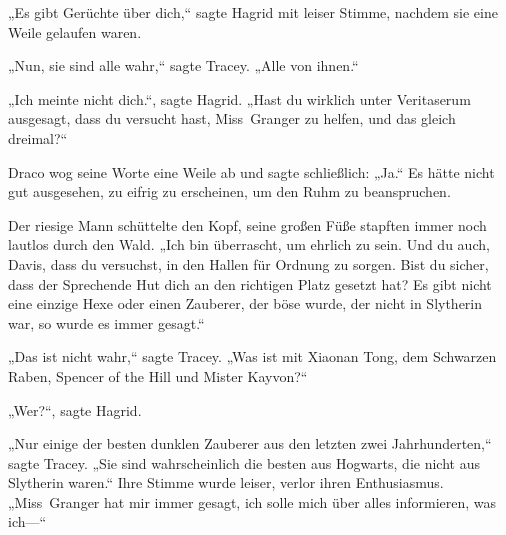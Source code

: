 „Es gibt Gerüchte über dich,“ sagte Hagrid mit leiser Stimme, nachdem sie eine Weile gelaufen waren.

„Nun, sie sind alle wahr,“ sagte Tracey. „Alle von ihnen.“

„Ich meinte nicht dich.“, sagte Hagrid. „Hast du wirklich unter Veritaserum ausgesagt, dass du versucht hast, Miss~Granger zu helfen, und das gleich dreimal?“

Draco wog seine Worte eine Weile ab und sagte schließlich: „Ja.“
Es hätte nicht gut ausgesehen, zu eifrig zu erscheinen, um den Ruhm zu beanspruchen.

Der riesige Mann schüttelte den Kopf, seine großen Füße stapften immer noch lautlos durch den Wald. „Ich bin überrascht, um ehrlich zu sein. Und du auch, Davis, dass du versuchst, in den Hallen für Ordnung zu sorgen. Bist du sicher, dass der Sprechende Hut dich an den richtigen Platz gesetzt hat? Es gibt nicht eine einzige Hexe oder einen Zauberer, der böse wurde, der nicht in Slytherin war, so wurde es immer gesagt.“

„Das ist nicht wahr,“ sagte Tracey. „Was ist mit Xiaonan Tong, dem Schwarzen Raben, Spencer of the Hill und Mister Kayvon?“

„Wer?“, sagte Hagrid.

„Nur einige der besten dunklen Zauberer aus den letzten zwei Jahrhunderten,“ sagte Tracey. „Sie sind wahrscheinlich die besten aus Hogwarts, die nicht aus Slytherin waren.“ Ihre Stimme wurde leiser, verlor ihren Enthusiasmus. „Miss~Granger hat mir immer gesagt, ich solle mich über alles informieren, was ich—“

